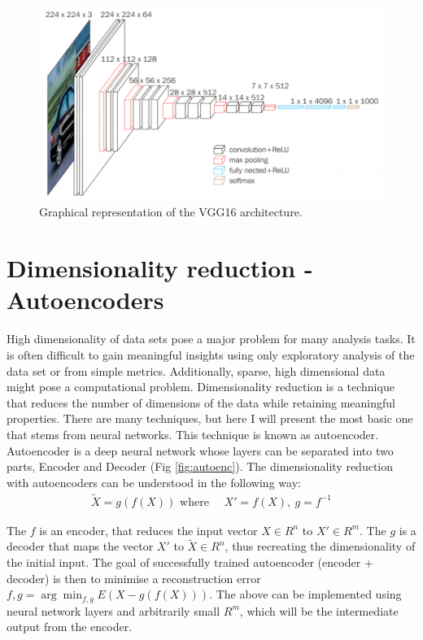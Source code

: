\begin{figure}
  \centering
  \includegraphics[width=0.9\linewidth]{figures/chapter3/vgg16.png}
  \caption{Graphical representation of the VGG16 architecture.}
  \label{fig:vgg16}
\end{figure}

\section{Dimensionality reduction - Autoencoders}

High dimensionality of data sets pose a major problem for many analysis tasks.
It is often difficult to gain meaningful insights using only exploratory analysis of the data set or from simple metrics.
Additionally, sparse, high dimensional data might pose a computational problem.
Dimensionality reduction is a technique that reduces the number of dimensions of the data while retaining meaningful properties.
There are many techniques, but here I will present the most basic one that stems from neural networks.
This technique is known as autoencoder.
Autoencoder is a deep neural network whose layers can be separated into two parts, Encoder and Decoder (Fig \ref{fig:autoenc}).
The dimensionality reduction with autoencoders can be understood in the following way:
\begin{align*}
\tilde{X} = g(f(X))  \text{ where } \quad X\prime = f(X),\ g = f^{-1}
\end{align*}

The $f$ is an encoder, that reduces the input vector $X \in R^{n}$ to $X' \in R^{m}$.
The $g$ is a decoder that maps the vector $X'$ to $\tilde{X} \in R^{n}$, thus recreating the dimensionality of the initial input.
The goal of successfully trained autoencoder (encoder + decoder) is then to minimise a reconstruction error $f,g = \arg\min_{f,g} E(X-g(f(X)))$.
The above can be implemented using neural network layers and arbitrarily small $R^{m}$, which will be the intermediate output from the encoder.

